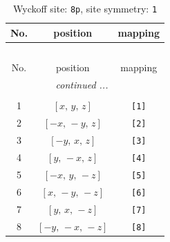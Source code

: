 \documentclass[fleqn,8pt]{jsarticle}
\begin{document}
\renewcommand{\arraystretch}{1.2}
\begin{longtable}{ccc}
\caption{Wyckoff site: {\tt 8p}, site symmetry: {\tt 1}}
 \\
 \hline \hline
No. & position & mapping \\ \hline \endfirsthead

\multicolumn{2}{l}{\tablename\ \thetable{}} \\
 \hline \hline
No. & position & mapping \\ \hline \endhead

 \hline \hline
\multicolumn{2}{r}{\footnotesize\it continued ...} \\ \endfoot

 \hline \hline
\multicolumn{2}{r}{} \\ \endlastfoot

1 & $\left[ x,\, y,\, z \right]$ & {\tt [1]} \\ \hline
2 & $\left[ - x,\, - y,\, z \right]$ & {\tt [2]} \\ \hline
3 & $\left[ - y,\, x,\, z \right]$ & {\tt [3]} \\ \hline
4 & $\left[ y,\, - x,\, z \right]$ & {\tt [4]} \\ \hline
5 & $\left[ - x,\, y,\, - z \right]$ & {\tt [5]} \\ \hline
6 & $\left[ x,\, - y,\, - z \right]$ & {\tt [6]} \\ \hline
7 & $\left[ y,\, x,\, - z \right]$ & {\tt [7]} \\ \hline
8 & $\left[ - y,\, - x,\, - z \right]$ & {\tt [8]} \\
\end{longtable}
\end{document}
